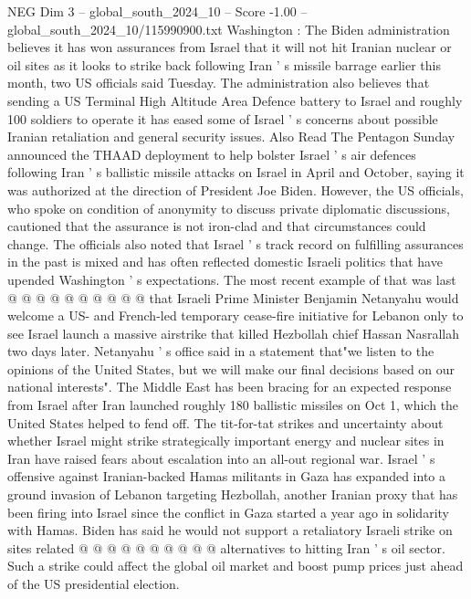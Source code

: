 \begin{textsample}{NEG Dim 3 – global\_south\_2024\_10 – Score -1.00 – global\_south\_2024\_10/115990900.txt}  \label{ex:f3_neg_056}
Washington : The Biden administration believes it has won assurances from Israel that it will not hit Iranian nuclear or oil sites as it looks to strike back following Iran ' s missile barrage earlier this month, two US officials said Tuesday.
The administration also believes that sending a US Terminal High Altitude Area Defence battery to Israel and roughly 100 soldiers to operate it has eased some of Israel ' s concerns about possible Iranian retaliation and general security issues.
Also Read The Pentagon Sunday announced the THAAD deployment to help bolster Israel ' s air defences following Iran ' s ballistic missile attacks on Israel in April and October, saying it was authorized at the direction of President Joe Biden.
However, the US officials, who spoke on condition of anonymity to discuss private diplomatic discussions, cautioned that the assurance is not iron-clad and that circumstances could change.
The officials also noted that Israel ' s track record on fulfilling assurances in the past is mixed and has often reflected domestic Israeli politics that have upended Washington ' s expectations.
The most recent example of that was last @ @ @ @ @ @ @ @ @ @ that Israeli Prime Minister Benjamin Netanyahu would welcome a US- and French-led temporary cease-fire initiative for Lebanon only to see Israel launch a massive airstrike that killed Hezbollah chief Hassan Nasrallah two days later.
Netanyahu ' s office said in a statement that"we listen to the opinions of the United States, but we will make our final decisions based on our national interests".
The Middle East has been bracing for an expected response from Israel after Iran launched roughly 180 ballistic missiles on Oct 1, which the United States helped to fend off.
The tit-for-tat strikes and uncertainty about whether Israel might strike strategically important energy and nuclear sites in Iran have raised fears about escalation into an all-out regional war.
Israel ' s offensive against Iranian-backed Hamas militants in Gaza has expanded into a ground invasion of Lebanon targeting Hezbollah, another Iranian proxy that has been firing into Israel since the conflict in Gaza started a year ago in solidarity with Hamas.
Biden has said he would not support a retaliatory Israeli strike on sites related @ @ @ @ @ @ @ @ @ @ alternatives to hitting Iran ' s oil sector.
Such a strike could affect the global oil market and boost pump prices just ahead of the US presidential election.

\end{textsample}

